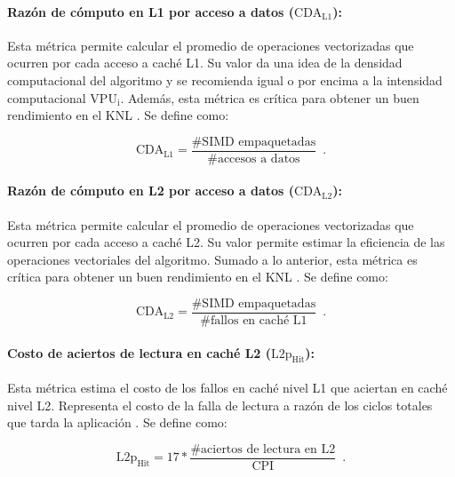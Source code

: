 \paragraph*{Raz\'on de c\'omputo en L1 por acceso a datos ($\text{CDA}_\text{L1}$):}

Esta m\'etrica permite calcular el promedio de operaciones vectorizadas que ocurren por cada acceso a cach\'e L1. Su valor da una idea de la densidad computacional del algoritmo y se recomienda igual o por encima a la intensidad computacional $\text{VPU}_{\text{i}}$. Adem\'as, esta m\'etrica es cr\'itica para obtener un buen rendimiento en el KNL \cite{Jeffers2016315}. Se define como:

\begin{equation}
\text{CDA}_\text{L1} = \frac{\text{\# SIMD empaquetadas}}{\text{\# accesos a datos}} \enspace .
\end{equation}



\paragraph*{Raz\'on de c\'omputo en L2 por acceso a datos ($\text{CDA}_\text{L2}$):}

Esta m\'etrica permite calcular el promedio de operaciones vectorizadas que ocurren por cada acceso a cach\'e L2. Su valor permite estimar la eficiencia de las operaciones vectoriales del algoritmo. Sumado a lo anterior, esta m\'etrica es cr\'itica para obtener un buen rendimiento en el KNL \cite{Jeffers2016315}. Se define como:

\begin{equation}
\text{CDA}_{\text{L2}} = \frac{\text{\# SIMD empaquetadas}}{\text{\# fallos en cach\'e L1}} \enspace .
\end{equation}


\paragraph*{Costo de aciertos de lectura en cach\'e L2 ($\text{L2p}_{\text{Hit}}$):}

Esta m\'etrica estima el costo de los fallos en cach\'e nivel L1 que aciertan en cach\'e nivel L2. Representa el costo de la falla de lectura a raz\'on de los ciclos totales que tarda la aplicaci\'on \cite{Jeffers2016315}. Se define como:

\begin{equation}
\text{L2p}_{\text{Hit}} = 17 *\frac{\text{\# aciertos de lectura en L2}}{\text{CPI}} \enspace .
\end{equation}


